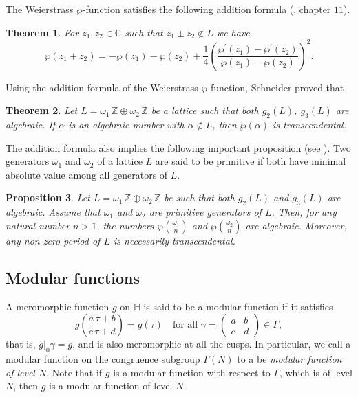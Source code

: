 \documentclass[11pt, reqno]{amsart}
\newtheorem{theorem}{Theorem}[section]
\newtheorem{prop}[theorem]{Proposition}
\begin{document}
The Weierstrass $\wp$-function satisfies the following addition formula (\cite{r-m}, chapter $11$).
 \begin{theorem} \label{addf}
 For $z_1, z_2\in \mathbb{C}$ such that $z_1\pm z_2\notin L$ we have
$$
\wp\left(z_1+z_2\right)=-\wp\left(z_1\right)-\wp\left(z_2\right)+\frac{1}{4}\left(\frac{\wp^{\prime}\left(z_1\right)-\wp^{\prime}\left(z_2\right)}{\wp\left(z_1\right)-\wp\left(z_2\right)}\right)^2 .
$$
\end{theorem}
Using the addition formula of the Weierstrass $\wp$-function, Schneider \cite{schneider.} proved that 
\begin{theorem}\label{tranw}
    Let $L=\omega_1\,\mathbb{Z}\oplus\omega_2\,\mathbb{Z}$ be a lattice such that both $g_2(L)$, $g_3(L)$ are algebraic. If $\alpha$ is an algebraic number with $\alpha\notin L$, then $\wp(\alpha)$ is transcendental.
\end{theorem}
The addition formula also implies the following important proposition (see \cite{r-m}). Two generators $\omega_1$ and $\omega_2$ of a lattice $L$ are said to be primitive if both have minimal absolute value among all generators of $L$.
\begin{prop}\label{tranp}
Let $L=\omega_1\,\mathbb{Z}\oplus\omega_2\,\mathbb{Z}$ be such that both $g_2(L)$ and $g_3(L)$ are algebraic. Assume that $\omega_1$ and $\omega_2$ are primitive generators of $L$. Then, for any natural number $n>1$, the numbers $\wp(\frac{\omega_1}{n})$ and $\wp(\frac{\omega_2}{n})$ are algebraic. Moreover, any non-zero period of $L$ is necessarily transcendental.\\
\end{prop}

\subsection{Modular functions}

A meromorphic function $g$ on $\mathbb{H}$ is said to be a modular function if it satisfies
\begin{equation}
g\left(\frac{a\,\tau+b}{c\,\tau+d}\right)=g(\tau)\quad\text{for all }
\gamma=\left(\begin{smallmatrix}
   a  & b \\
   c  & d
\end{smallmatrix} \right)\in \Gamma,
\end{equation}
that is, $g \big|_0 \gamma = g$, and is also meromorphic at all the cusps. In particular, we call a modular function on the congruence subgroup $\Gamma(N)$ to a be \emph{modular function of level $N$}. Note that if $g$ is a modular function with respect to $\Gamma$, which is of level $N$, then $g$ is a modular function of level $N$.\\
\end{document}
